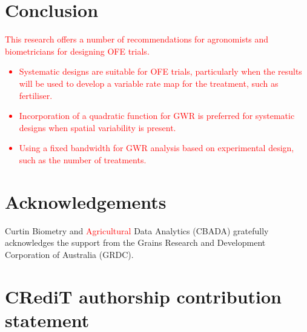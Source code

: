\documentclass[a4paper]{article} 	%
\newcommand{\zc}[1]{\textcolor{red}{#1}}
\begin{document}
\section{Conclusion}\label{Sec:Conclusion}



\zc{This research offers a number of recommendations for agronomists and biometricians for designing OFE trials.}
\zc{
\begin{itemize}
    \item Systematic designs are suitable for OFE trials, particularly when the results will be used to develop a variable rate map for the treatment, such as fertiliser. 
    \item Incorporation of a quadratic function for GWR is preferred for systematic designs when spatial variability is present.
    \item Using a fixed bandwidth for GWR analysis based on experimental design, such as the number of treatments. 
\end{itemize}
}

\section*{Acknowledgements}

Curtin Biometry and \zc{Agricultural} Data Analytics (CBADA) gratefully acknowledges the support from the Grains Research and Development Corporation of Australia (GRDC).

\section*{CRediT authorship contribution statement}
\end{document}
